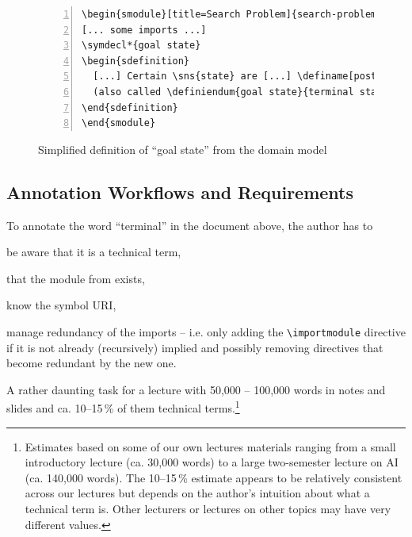 \documentclass[runningheads]{llncs}
\begin{document}
\begin{figure}\centering
\begin{lstlisting}[morekeywords={definame,symdecl,definiendum},numbers=left,
escapechar=!]
\begin{smodule}[title=Search Problem]{search-problem}
[... some imports ...]
\symdecl*{goal state}
\begin{sdefinition}
  [...] Certain \sns{state} are [...] \definame[post=s]{goal state} [...]
  (also called \definiendum{goal state}{terminal states}).
\end{sdefinition}
\end{smodule}
\end{lstlisting}
  \caption{Simplified definition of ``goal state'' from the domain model}\label{fig:state-space}
\end{figure}

\subsection{Annotation Workflows and Requirements}\label{sec:workflows}

To annotate the word ``terminal'' in the document above, the author has to 
\begin{inparaenum}[\em i\rm)]
\item be aware that it is a
technical term, 
\item that the module from  exists,
\item know the symbol URI, 
\item manage redundancy of the imports -- i.e. only adding the \lstinline|\importmodule|
  directive if it is not already (recursively) implied and possibly removing directives
  that become redundant by the new one.
\end{inparaenum}
A rather daunting task for a lecture with 50,000 -- 100,000 words in notes and slides and ca. 10--15\,\% of them technical terms.\footnote{
        Estimates based on some of our own lectures materials
        ranging from a small introductory lecture (ca. 30,000 words)
        to a large two-semester lecture on AI (ca. 140,000 words).
        The 10--15\,\% estimate appears to be relatively consistent across our lectures
        but depends on the author's intuition about what a technical term is.
        Other lecturers or lectures on other topics may have very different values.
}
\end{document}
